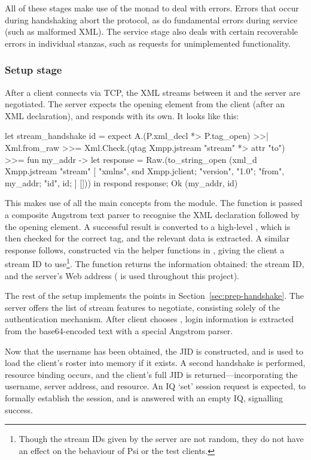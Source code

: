 \documentclass[12pt,a4paper,twoside,openright]{report}
\begin{document}
{All of these stages make use of the  monad to deal with errors. Errors that occur during handshaking abort the protocol, as do fundamental errors during service (such as malformed XML). The service stage also deals with certain recoverable errors in individual stanzas, such as requests for unimplemented functionality.

\subsubsection{Setup stage}\label{sec:server-setup}
After a client connects via TCP, the XML streams between it and the server are negotiated. The server expects the  opening element from the client (after an XML declaration), and responds with its own. It looks like this:

\begin{ocaml}
let stream_handshake id =
  expect A.(P.xml_decl *> P.tag_open) >>| Xml.from_raw >>=
    Xml.Check.(qtag Xmpp.jstream "stream" *> attr "to") >>= fun my_addr ->
  let response = Raw.(to_string_open (xml_d Xmpp.jstream "stream" [
    "xmlns", snd Xmpp.jclient;
    "version", "1.0"; "from", my_addr; "id", id;
  ] []))
  in respond response; Ok (my_addr, id)
\end{ocaml}

This makes use of all the main concepts from the  module. The  function is passed a composite Angstrom text parser to recognise the XML declaration followed by the opening  element. A successful result is converted to a high-level , which is then checked for the correct tag, and the relevant data is extracted. A similar response follows, constructed via the helper functions in , giving the client a stream ID to use\footnote{Though the stream IDs given by the server are not random, they do not have an effect on the behaviour of Psi or the test clients.}. The function returns the information obtained: the stream ID, and the server's Web address ( is used throughout this project).

The rest of the setup implements the points in Section~\ref{sec:prep-handshake}. The server offers the list of stream features to negotiate, consisting solely of the  authentication mechanism. After client chooses , login information is extracted from the base64-encoded text with a special Angstrom parser.

Now that the username has been obtained, the JID is constructed, and is used to load the client's roster into memory if it exists. A second handshake is performed, resource binding occurs, and the client's full JID is returned---incorporating the username, server address, and resource. An IQ `set' session request is expected, to formally establish the session, and is answered with an empty IQ, signalling success.

}
\end{document}
